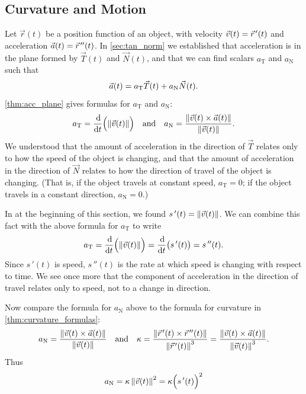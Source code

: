 \vspace{-\topsep}\vspace{-\partopsep}

\subsection{Curvature and Motion}

Let $\vec r(t)$ be a position function of an object, with velocity $\vec v(t) = \vec r\hskip1.25pt '(t)$ and acceleration $\vec a(t)=\vec r\hskip1.25pt ''(t)$. In \autoref{sec:tan_norm} we established that acceleration is in the plane formed by $\vec T(t)$ and $\vec N(t)$, and that we can find scalars $a_{\mathrm{T}}$ and $a_{\mathrm{N}}$ such that 
%
%
%
\[\vec a(t) = a_{\mathrm{T}}\vec T(t) + a_{\mathrm{N}}\vec N(t).\]
\autoref{thm:acc_plane} gives formulas for $a_{\mathrm{T}}$ and $a_{\mathrm{N}}$:
\[a_{\mathrm{T}} = \frac{\operatorname{d}\!}{\operatorname{d}\! t}\Bigl(\left\lVert \vec v(t) \right\rVert\Bigr) \quad \text{and} \quad a_{\mathrm{N}} = \frac{\left\lVert \vec v(t)\times \vec a(t) \right\rVert}{\left\lVert \vec v(t) \right\rVert}.\]
We understood that the amount of acceleration in the direction of $\vec T$ relates only to how the speed of the object is changing, and that the amount of acceleration in the direction of $\vec N$ relates to how the direction of travel of the object is changing. (That is, if the object travels at constant speed, $a_{\mathrm{T}}=0$; if the object travels in a constant direction, $a_{\mathrm{N}}=0$.)


In  at the beginning of this section, we found
$s\,'(t) = \left\lVert \vec v(t) \right\rVert$. We can combine this fact with the above formula for $a_{\mathrm{T}}$ to write
\[a_{\mathrm{T}} = \frac{\operatorname{d}\!}{\operatorname{d}\! t}\Bigl(\left\lVert \vec v(t) \right\rVert\Bigr) = \frac{\operatorname{d}\!}{\operatorname{d}\! t}\bigl( s\,'(t)\bigr) = s\,''(t).\]
Since $s\,'(t)$ is speed, $s\,''(t)$ is the rate at which speed is changing with respect to time. We see once more that the component of acceleration in the direction of travel relates only to speed, not to a change in direction.

Now compare the formula for $a_{\mathrm{N}}$ above to the formula for curvature in \autoref{thm:curvature_formulas}:
\[a_{\mathrm{N}} = \frac{\left\lVert \vec v(t)\times \vec a(t) \right\rVert}{\left\lVert \vec v(t) \right\rVert}\quad \text{and}\quad \kappa = \frac{\left\lVert \vec r\hskip1.25pt '(t)\times\vec r\hskip1.25pt ''(t) \right\rVert}{\left\lVert \vec r\hskip1.25pt '(t) \right\rVert^3}=\frac{\left\lVert \vec v(t)\times \vec a(t) \right\rVert}{\left\lVert \vec v(t) \right\rVert^3} .\]
Thus 
\begin{equation}\label{eq:curvature_an}
a_{\mathrm{N}} = \kappa \left\lVert \vec v(t) \right\rVert^2 = \kappa\Bigl(s\,'(t)\Bigr)^2
\end{equation}

